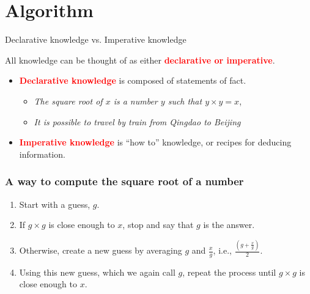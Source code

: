 \documentclass{sintefbeamer}
\begin{document}
\section{Algorithm}

\begin{frame}{Declarative knowledge vs. Imperative knowledge}

  All knowledge can be thought of as either \textcolor{red}{\textbf{declarative or imperative}}.

  \begin{itemize}[<+->]
    \item \textcolor{red}{\textbf{Declarative knowledge}} is composed of statements of fact.
          \begin{itemize}
            \item \textit{The square root of $x$ is a number $y$ such that $y \times y = x$},
            \item \textit{It is possible to travel by train from Qingdao to Beijing}
          \end{itemize}
    \item \textcolor{red}{\textbf{Imperative knowledge}} is ``how to'' knowledge, or recipes for deducing information.
  \end{itemize}

\end{frame}

\begin{frame}
  \frametitle{A way to compute the square root of a number}

  \pause

  \begin{enumerate}
    \item Start with a guess, $g$.
    \item If $g \times g$ is close enough to $x$, stop and say that $g$ is the answer.
    \item Otherwise, create a new guess by averaging $g$ and $\frac{x}{g}$, i.e., $\frac{(g + \frac{x}{g})}{2}$.
    \item Using this new guess, which we again call $g$, repeat the process until $g \times g$ is close enough to $x$.
  \end{enumerate}

\end{frame}
\end{document}
